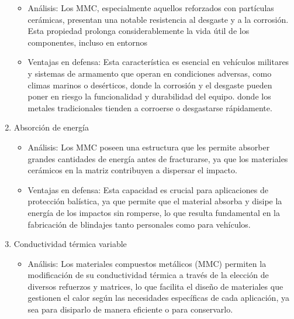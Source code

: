 \documentclass[letterpaper, 12pt]{article}
\begin{document}
\begin{enumerate}
            \begin{itemize}
                  \item Análisis: Los MMC, especialmente aquellos reforzados con partículas cerámicas,
                        presentan una notable resistencia al desgaste y a la corrosión. Esta propiedad
                        prolonga considerablemente la vida útil de los componentes, incluso en entornos
                  \item Ventajas en defensa: Esta característica es esencial en vehículos militares y
                        sistemas de armamento que operan en condiciones adversas, como climas marinos o
                        desérticos, donde la corrosión y el desgaste pueden poner en riesgo la
                        funcionalidad y durabilidad del equipo. donde los metales tradicionales tienden
                        a corroerse o desgastarse rápidamente.
            \end{itemize}

      \item Absorción de energía

            \begin{itemize}
                  \item Análisis: Los MMC poseen una estructura que les permite absorber grandes
                        cantidades de energía antes de fracturarse, ya que los materiales cerámicos en
                        la matriz contribuyen a dispersar el impacto.

                  \item Ventajas en defensa: Esta capacidad es crucial para aplicaciones de protección
                        balística, ya que permite que el material absorba y disipe la energía de los
                        impactos sin romperse, lo que resulta fundamental en la fabricación de
                        blindajes tanto personales como para vehículos.
            \end{itemize}

      \item Conductividad térmica variable

            \begin{itemize}
                  \item Análisis: Los materiales compuestos metálicos (MMC) permiten la modificación de
                        su conductividad térmica a través de la elección de diversos refuerzos y
                        matrices, lo que facilita el diseño de materiales que gestionen el calor según
                        las necesidades específicas de cada aplicación, ya sea para disiparlo de manera
                        eficiente o para conservarlo.


\end{itemize}
\end{enumerate}
\end{document}
